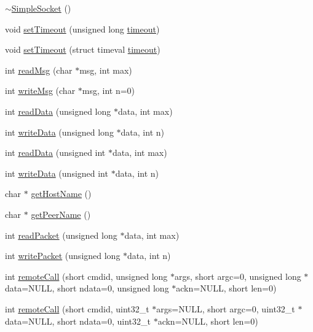 \begin{DoxyCompactItemize}
\item 
\hyperlink{classSimpleSocket_abf7d41536d2ecf56de1364d36db5fd67}{$\sim$\-Simple\-Socket} ()
\item 
void \hyperlink{classSimpleSocket_af8d68590cf2fd476dd7adf9681e68d1a}{set\-Timeout} (unsigned long \hyperlink{classSimpleSocket_ac2e777bd36689f4f136b9c5b9e9c5f0e}{timeout})
\item 
void \hyperlink{classSimpleSocket_aca833e1fd8c646100ba0c463ba68f527}{set\-Timeout} (struct timeval \hyperlink{classSimpleSocket_ac2e777bd36689f4f136b9c5b9e9c5f0e}{timeout})
\item 
int \hyperlink{classSimpleSocket_adf772ef82480b834bc3bc74ac0d21df9}{read\-Msg} (char $\ast$msg, int max)
\item 
int \hyperlink{classSimpleSocket_a095da277758577ab30ed76fabe130c89}{write\-Msg} (char $\ast$msg, int n=0)
\item 
int \hyperlink{classSimpleSocket_a8a8c2258b40fc70bc67405ef1f40e99b}{read\-Data} (unsigned long $\ast$data, int max)
\item 
int \hyperlink{classSimpleSocket_ab24262c3889678da11168ee6de116a28}{write\-Data} (unsigned long $\ast$data, int n)
\item 
int \hyperlink{classSimpleSocket_a9dd04548e098650a982ee8a4f44d080b}{read\-Data} (unsigned int $\ast$data, int max)
\item 
int \hyperlink{classSimpleSocket_aa8ece72de04ca74047b3a0b7f7a20484}{write\-Data} (unsigned int $\ast$data, int n)
\item 
char $\ast$ \hyperlink{classSimpleSocket_ab0e4f23eb7c541d6c8a062fecfdc2524}{get\-Host\-Name} ()
\item 
char $\ast$ \hyperlink{classSimpleSocket_aeb9df0d50ad09e65aaeba39b2372b1fd}{get\-Peer\-Name} ()
\item 
int \hyperlink{classSimpleSocket_af1de8044e016d3e6f0baf14a7130515f}{read\-Packet} (unsigned long $\ast$data, int max)
\item 
int \hyperlink{classSimpleSocket_a4c0227fb99f56767449617d88f1912bc}{write\-Packet} (unsigned long $\ast$data, int n)
\item 
int \hyperlink{classSimpleSocket_a861ec1830251182b7581c9db0a012c97}{remote\-Call} (short cmdid, unsigned long $\ast$args, short argc=0, unsigned long $\ast$data=N\-U\-L\-L, short ndata=0, unsigned long $\ast$ackn=N\-U\-L\-L, short len=0)
\item 
int \hyperlink{classSimpleSocket_aa707339f5e3cad2c475e9abbbea00328}{remote\-Call} (short cmdid, uint32\-\_\-t $\ast$args=N\-U\-L\-L, short argc=0, uint32\-\_\-t $\ast$data=N\-U\-L\-L, short ndata=0, uint32\-\_\-t $\ast$ackn=N\-U\-L\-L, short len=0)

\end{DoxyCompactItemize}
